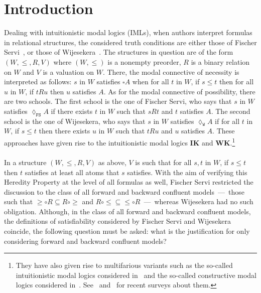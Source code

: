 \documentclass[draft]{article}
\def\WK{\mathbf{WK}}
\def\IK{\mathbf{IK}}
\begin{document}
\section{Introduction}
%
%
Dealing with intuitionistic modal logics (IMLs), when authors interpret formulas in relational structures, the considered truth conditions are either those of Fischer Servi~\cite{FischerServi:1984}, or those of Wijesekera~\cite{Wijesekera:1990}.
The structures in question are of the form $(W,{\leq},{R},V)$ where $(W,{\leq})$ is a nonempty preorder, $R$ is a binary relation on $W$ and $V$ is a valuation on $W$.
There, the modal connective of necessity is interpreted as follows: $s$ in $W$ satisfies ${\square}A$ when for all $t$ in $W$, if $s{\leq}t$ then for all $u$ in $W$, if $t{R}u$ then $u$ satisfies $A$.
As for the modal connective of possibility, there are two schools.
The first school is the one of Fischer Servi, who says that $s$ in $W$ satisfies ${\lozenge_{\mathtt{FS}}}A$ if there exists $t$ in $W$ such that $s{R}t$ and $t$ satisfies $A$.
The second school is the one of Wijesekera, who says that $s$ in $W$ satisfies ${\lozenge_{\mathtt{W}}}A$ if for all $t$ in $W$, if $s{\leq}t$ then there exists $u$ in $W$ such that $t{R}u$ and $u$ satisfies $A$.
These approaches have given rise to the intuitionistic modal logics $\IK$ and $\WK$.\footnote{They have also given rise to multifarious variants such as the so-called intuitionistic modal logics considered in~\cite{Bierman:dePaiva:2000,Lin:Ma:2019,Marin:et:al:2021} and the so-called constructive modal logics considered in~\cite{Alechina:et:al:2001,Arisaka:et:al:2015,deGroot:et:al:2026}.
See~\cite{Olivetti:2022} and~\cite{IMLA:2017} for recent surveys about them.}
%
%
\\
\\
%
%
In a structure $(W,{\leq},{R},V)$ as above, $V$ is such that for all $s,t$ in $W$, if $s{\leq}t$ then $t$ satisfies at least all atoms that $s$ satisfies.
With the aim of verifying this Heredity Property at the level of all formulas as well, Fischer Servi restricted the discussion to the class of all forward and backward confluent models~---~those such that ${\geq}{\circ}{R}{\subseteq}{R}{\circ}{\geq}$ and ${R}{\circ}{\leq}{\subseteq}{\leq}{\circ}{R}$~---~whereas Wijesekera had no such obligation.
Although, in the class of all forward and backward confluent models, the definitions of satisfiability considered by Fischer Servi and Wijesekera coincide, the following question must be asked: what is the justification for only considering forward and backward confluent models?
\end{document}
